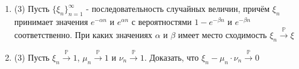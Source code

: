 \documentclass[a4paper, 14pt]{extarticle}
\begin{document}
\begin{enumerate}
\item (3) Пусть $\{\xi_n\}_{n=1}^{\infty}$ - последовательность случайных величин, 
причём $\xi_n$ принимает значения $e^{-\alpha n}$ и $e^{\alpha n}$ с вероятностями $1 - e^{-\beta n}$ и $e^{-\beta n}$
соответственно. При каких значениях $\alpha$ и $\beta$ имеет место сходимость $\xi_n \overset{\mathbb{P}}{\to} \xi$

\item (3) Пусть $\xi_n \overset{\mathbb{P}}{\to} 1$, $\mu_n \overset{\mathbb{P}}{\to} 1$ и 
$\nu_n \overset{\mathbb{P}}{\to} 1$.
Доказать, что $\xi_n - \mu_n \cdot \nu_n \overset{\mathbb{P}}{\to}0$




\end{enumerate}
\end{document}
